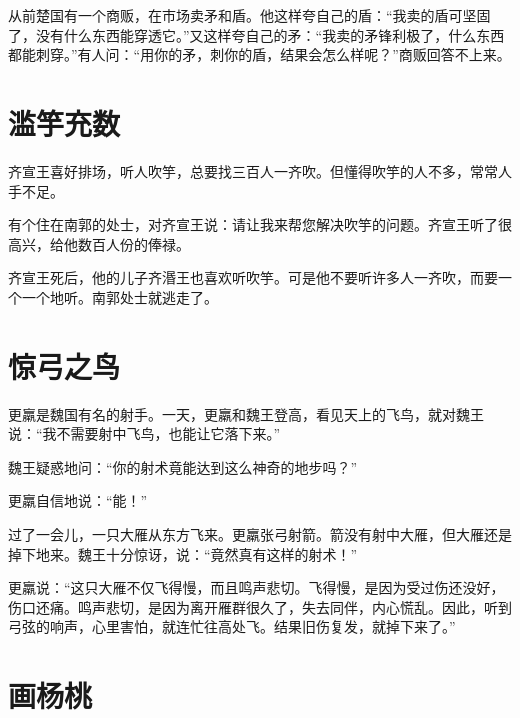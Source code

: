 \documentclass[12pt,UTF-8,openany]{ctexbook}
\begin{document}
\begin{large}
    
    从前楚国有一个商贩，在市场卖矛和盾。他这样夸自己的盾：“我卖的盾可坚固了，没有什么东西能穿透它。”又这样夸自己的矛：“我卖的矛锋利极了，什么东西都能刺穿。”有人问：“用你的矛，刺你的盾，结果会怎么样呢？”商贩回答不上来。
    
\end{large}



\chapter{滥竽充数}

\begin{large}
    
    齐宣王喜好排场，听人吹竽，总要找三百人一齐吹。但懂得吹竽的人不多，常常人手不足。
    
    有个住在南郭的处士，对齐宣王说：请让我来帮您解决吹竽的问题。齐宣王听了很高兴，给他数百人份的俸禄。
    
    齐宣王死后，他的儿子齐湣王也喜欢听吹竽。可是他不要听许多人一齐吹，而要一个一个地听。南郭处士就逃走了。
    
\end{large}



\chapter{惊弓之鸟}

\begin{large}
    
    更羸是魏国有名的射手。一天，更羸和魏王登高，看见天上的飞鸟，就对魏王说：“我不需要射中飞鸟，也能让它落下来。”
    
    魏王疑惑地问：“你的射术竟能达到这么神奇的地步吗？”
    
    更羸自信地说：“能！”
    
    过了一会儿，一只大雁从东方飞来。更羸张弓射箭。箭没有射中大雁，但大雁还是掉下地来。魏王十分惊讶，说：“竟然真有这样的射术！”
    
    更羸说：“这只大雁不仅飞得慢，而且鸣声悲切。飞得慢，是因为受过伤还没好，伤口还痛。鸣声悲切，是因为离开雁群很久了，失去同伴，内心慌乱。因此，听到弓弦的响声，心里害怕，就连忙往高处飞。结果旧伤复发，就掉下来了。”
    
\end{large}



\chapter{画杨桃}
\end{document}
